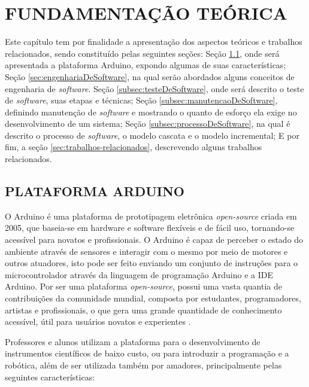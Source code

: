 
\chapter{FUNDAMENTAÇÃO TEÓRICA}
\label{chap:fundamentacao-teorica}Este capítulo tem por finalidade a apresentação dos aspectos teóricos e trabalhos relacionados, sendo constituído pelas seguintes seções: Seção \ref{sec:arduino}, onde será apresentada a plataforma Arduino, expondo algumas de suas características; Seção \ref{sec:engenhariaDeSoftware}, na qual serão abordados alguns conceitos de engenharia de \textit{software}. Seção \ref{subsec:testeDeSoftware}, onde será descrito o teste de \textit{software}, suas etapas e técnicas; Seção \ref{subsec:manutencaoDeSoftware}, definindo manutenção de \textit{software} e mostrando o quanto de esforço ela exige no desenvolvimento de um sistema; Seção \ref{subsec:processoDeSoftware}, na qual é descrito o processo de \textit{software}, o modelo cascata e o modelo incremental; E por fim, a seção \ref{sec:trabalhos-relacionados}, descrevendo alguns trabalhos relacionados.

\section{PLATAFORMA ARDUINO}
\label{sec:arduino} O Arduino é uma plataforma de prototipagem eletrônica \textit{open-source} criada em 2005, que baseia-se em hardware e software flexíveis e de fácil uso, tornando-se acessível para novatos e profissionais. O Arduino é capaz de perceber o estado do ambiente através de sensores e interagir com o mesmo por meio de motores e outros atuadores, isto pode ser feito enviando um conjunto de instruções para o microcontrolador através da linguagem de programação Arduino e a IDE Arduino. Por ser uma plataforma \textit{open-source}, possui uma vasta quantia de contribuições da comunidade mundial, composta por estudantes, programadores, artistas e profissionais, o que gera uma grande quantidade de conhecimento acessível, útil para usuários novatos e experientes \cite{arduino2018}.

Professores e alunos utilizam a plataforma para o desenvolvimento de instrumentos científicos de baixo custo, ou para introduzir a programação e a robótica, além de ser utilizada também por amadores, principalmente pelas seguintes características: 

